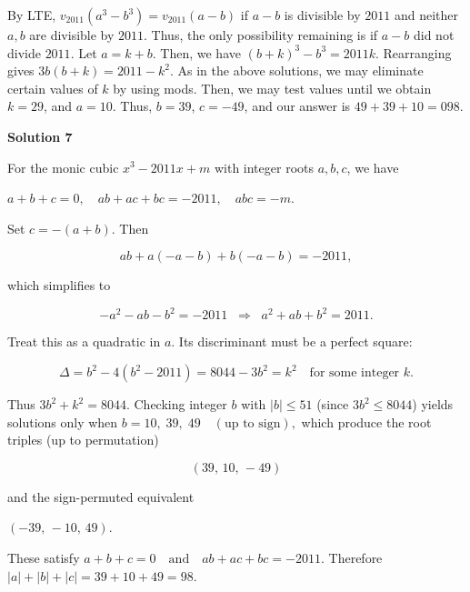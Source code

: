 \begin{enumerate}
 By LTE, $v_{2011}(a^3-b^3)=v_{2011}(a-b)$ if $a-b$ is divisible by $2011$ and neither $a,b$ are divisible by $2011$. Thus, the only possibility remaining is if $a-b$ did not divide $2011$. Let $a=k+b$. Then, we have $(b+k)^3-b^3=2011k$. Rearranging gives $3b(b+k)=2011-k^2$. As in the above solutions, we may eliminate certain values of $k$ by using mods. Then, we may test values until we obtain $k=29$, and $a=10$. Thus, $b=39$, $c=-49$, and our answer is $49+39+10=098$.

 



\textbf{Solution 7}

For the monic cubic $x^3 - 2011x + m$ with integer roots $a,b,c$, we have

 $a+b+c=0,\quad ab+ac+bc=-2011,\quad abc=-m.$

 Set $c=-(a+b).$ Then 

 
 \[ab + a(-a-b) + b(-a-b) = -2011,\]

 which simplifies to 

 
 \[-a^2 - ab - b^2 = -2011 \;\;\Longrightarrow\;\; a^2+ab+b^2=2011.\]

 Treat this as a quadratic in $a$. Its discriminant must be a perfect square:

 
 \[\Delta = b^2 - 4(b^2 - 2011) = 8044 - 3b^2 = k^2 \quad \text{for some integer }k.\]

 Thus $3b^2 + k^2 = 8044.$ Checking integer $b$ with $|b|\leq 51$ (since $3b^2 \leq 8044$) yields solutions only when  $b=10,\;39,\;49 \quad (\text{up to sign}),$ which produce the root triples (up to permutation)

 
 \[(39,\,10,\,-49)\]

 and the sign-permuted equivalent

 $(-39,\,-10,\,49).$

 These satisfy $a+b+c=0 \quad \text{and} \quad ab+ac+bc=-2011.$ Therefore $|a|+|b|+|c| = 39+10+49 =\boxed{98}$.

 


\end{enumerate}